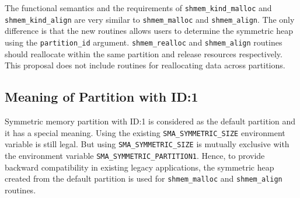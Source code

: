The functional semantics and the requirements of
\texttt{shmem\_kind\_malloc} and \texttt{shmem\_kind\_align}
are very similar to \texttt{shmem\_malloc} and \texttt{shmem\_align}.
The only difference is that the new routines allows users to determine
the symmetric heap using the \texttt{partition\_id} argument. %
\texttt{shmem\_realloc} and \texttt{shmem\_align} routines should
reallocate within the same partition and release resources respectively.
This proposal does not include routines for reallocating data across
partitions.


\subsection{Meaning of Partition with ID:1}
\label{src:smempart/part1}
Symmetric memory partition with ID:1 is considered as the default
partition and it has a special meaning.
Using the existing \texttt{SMA\_SYMMETRIC\_SIZE}
environment variable
is still legal. But using %
\texttt{SMA\_SYMMETRIC\_SIZE} is mutually
exclusive with the environment variable
\texttt{SMA\_SYMMETRIC\_PARTITION1}.
Hence, to provide
backward compatibility in existing legacy applications, the symmetric
heap created from the default partition is used for
\texttt{shmem\_malloc} and \texttt{shmem\_align} routines.%
